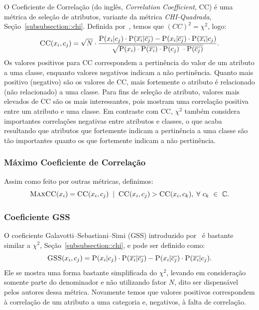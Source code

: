 O Coeficiente de Correlação (do inglês, \textit{Correlation Coefficient}, \textsc{CC}) é uma métrica de seleção de atributos, variante da métrica \textit{CHI-Quadrada}, Seção~\ref{subsubsection::chi}. Definida por~\cite{Ng97}, temos que $(CC)^2 = \chi^2$, logo:
\begin{equation}\label{eqn::ce}
   \textsc{CC}(x_i, c_j) = \sqrt{N} \cdot \frac{ \textsc{P}(x_i|c_j) \cdot \textsc{P}(\overline{x_i}|\overline{c_j}) - \textsc{P}(x_i|\overline{c_j}) \cdot \textsc{P}(\overline{x_i}|c_j) } {\sqrt{ \textsc{P}(x_i) \cdot \textsc{P}(\overline{x_i}) \cdot \textsc{P}(c_j) \ \cdot \textsc{P}(\overline{c_j}) } }.
\end{equation}
Os valores positivos para CC correspondem a pertinência do valor de um atributo a uma classe, enquanto valores negativos indicam a não pertinência. Quanto mais positivo (negativo) são os valores de CC, mais fortemente o atributo é relacionado (não relacionado) a uma classe. Para fins de seleção de atributo, valores mais elevados de CC são os mais interessantes, pois mostram uma correlação positiva entre um atributo e uma classe. Em contraste com CC, $\chi^2$ também considera importantes correlações negativas entre atributos e classes, o que acaba resultando que atributos que fortemente indicam a pertinência a uma classe são tão importantes quanto os que fortemente indicam a não pertinência.

\subsubsection{Máximo Coeficiente de Correlação}
\label{subsubsection::maxcc}

Assim como feito por outras métricas, definimos:
\begin{equation}\label{eqn::maxcc}
\textsc{MaxCC}(x_i) = \textsc{CC}(x_i,c_j) \; \; | \;\; \textsc{CC}(x_i, c_j) > \textsc{CC}(x_i, c_k), \; \forall\ c_k\ \in\ \mathbb{C}.
\end{equation}



\subsubsection{Coeficiente GSS}
\label{subsubsection::gss}
O coeficiente Galavotti–Sebastiani–Simi (GSS) introduzido por~\cite{Galavotti00} é bastante similar a $\chi^2$, Seção~\ref{subsubsection::chi}, e pode ser definido como:
\begin{equation}\label{eqn::gss}
   \textsc{GSS}(x_i, c_j) = \textsc{P}(x_i|c_j) \cdot \textsc{P}(\overline{x_i}|\overline{c_j}) - \textsc{P}(x_i|\overline{c_j}) \cdot \textsc{P}(\overline{x_i}|c_j).
\end{equation}
Ele se mostra uma forma bastante simplificada do $\chi^2$, levando em consideração somente parte do denominador e não utilizando fator $N$, dito ser dispensável pelos autores dessa métrica. Novamente temos que valores positivos correspondem à correlação de um atributo a uma categoria e, negativos, à falta de correlação. 

